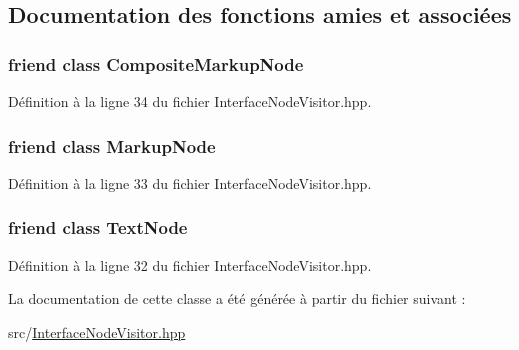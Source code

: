 \subsection{Documentation des fonctions amies et associées}
\hypertarget{classxml_1_1_interface_node_visitor_a8478dddac071858d6a22088eb161a690}{
\subsubsection[{CompositeMarkupNode}]{\setlength{\rightskip}{0pt plus 5cm}friend class {\bf CompositeMarkupNode}}}
\label{classxml_1_1_interface_node_visitor_a8478dddac071858d6a22088eb161a690}


Définition à la ligne 34 du fichier InterfaceNodeVisitor.hpp.

\hypertarget{classxml_1_1_interface_node_visitor_ac2a462e7a005c065f6778ccc0be88931}{
\subsubsection[{MarkupNode}]{\setlength{\rightskip}{0pt plus 5cm}friend class {\bf MarkupNode}}}
\label{classxml_1_1_interface_node_visitor_ac2a462e7a005c065f6778ccc0be88931}


Définition à la ligne 33 du fichier InterfaceNodeVisitor.hpp.

\hypertarget{classxml_1_1_interface_node_visitor_abd4faab11b504920cd6f8af02104143c}{
\subsubsection[{TextNode}]{\setlength{\rightskip}{0pt plus 5cm}friend class {\bf TextNode}}}
\label{classxml_1_1_interface_node_visitor_abd4faab11b504920cd6f8af02104143c}


Définition à la ligne 32 du fichier InterfaceNodeVisitor.hpp.



La documentation de cette classe a été générée à partir du fichier suivant :\begin{DoxyCompactItemize}
\item 
src/\hyperlink{_interface_node_visitor_8hpp}{InterfaceNodeVisitor.hpp}\end{DoxyCompactItemize}
